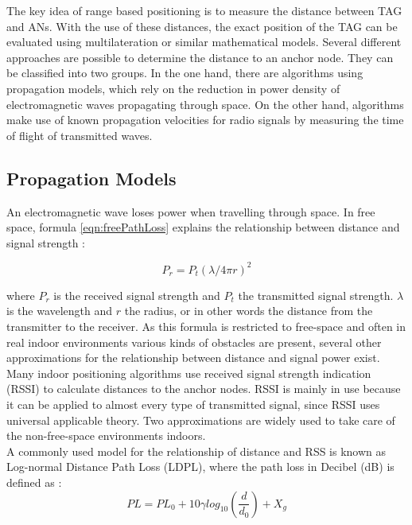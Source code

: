 The key idea of range based positioning is to measure the distance between TAG and ANs. With the use of these distances, the exact position of the TAG can be evaluated using multilateration or similar mathematical models. Several different approaches are possible to determine the distance to an anchor node. They can be classified into two groups. In the one hand, there are algorithms using propagation models, which rely on the reduction in power density of electromagnetic waves propagating through space. On the other hand, algorithms make use of known propagation velocities for radio signals  by measuring the time of flight of transmitted waves. 

\subsection{Propagation Models}
An electromagnetic wave loses power when travelling through space. In free space, formula \ref{eqn:freePathLoss} explains the relationship between distance and signal strength \cite{VorlesungCN}:

\begin{equation}
P_{r} = P_{t} (\lambda/4\pi r)^2
\label{eqn:freePathLoss}
\end{equation}

where $P_{r}$ is the received signal strength and $P_{t}$ the transmitted signal strength. $\lambda$ is the wavelength and $r$ the radius, or in other words the distance from the transmitter to the receiver. As this formula is restricted to free-space and often in real indoor environments various kinds of obstacles are present, several other approximations for the relationship between distance and signal power exist. Many indoor positioning algorithms use received signal strength indication (RSSI) to calculate distances to the anchor nodes. RSSI is mainly in use because it can be applied to almost every type of transmitted signal, since RSSI uses universal applicable theory. Two approximations are widely used to take care of the non-free-space environments indoors.\\
\noindent\hspace*{5mm}%
A commonly used model for the relationship of distance and RSS is known as Log-normal Distance Path Loss (LDPL), where the path loss in Decibel (dB) is defined as \cite{Sarkar}:
\begin{equation}
PL = PL_{0} +10 \gamma log_{10} (\frac{d}{d_{0}}) + X_{g}
\label{eqn:LDPL}
\end{equation}

